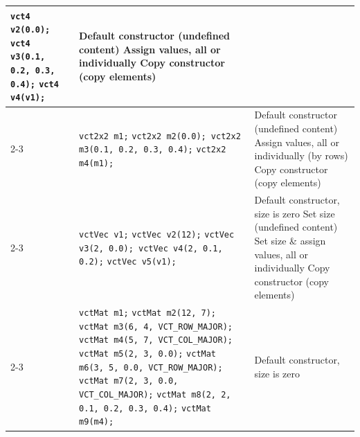 \documentclass[letterpaper,10pt]{article}
\begin{document}
\begin{center}
\begin{tabular}{|p{0.7in}|p{3.5in}|p{2.6in}|}
        \texttt{vct4 v2(0.0); vct4 v3(0.1, 0.2, 0.3, 0.4);} \newline
        \texttt{vct4 v4(v1);}
        &
        Default constructor (undefined content) \newline
        Assign values, all or individually \newline
        Copy constructor (copy elements)
        \\
        \cline{2-3}
        &
        \texttt{vct2x2 m1;} \newline
        \texttt{vct2x2 m2(0.0); vct2x2 m3(0.1, 0.2, 0.3, 0.4);} \newline
        \texttt{vct2x2 m4(m1);}
        &
        Default constructor (undefined content) \newline
        Assign values, all or individually (by rows) \newline
        Copy constructor (copy elements)
        \\
        \cline{2-3}
        &
        \texttt{vctVec v1;} \newline
        \texttt{vctVec v2(12);} \newline
        \texttt{vctVec v3(2, 0.0); vctVec v4(2, 0.1, 0.2);} \newline
        \texttt{vctVec v5(v1);}
        &
        Default constructor, size is zero \newline
        Set size (undefined content) \newline
        Set size \& assign values, all or individually \newline
        Copy constructor (copy elements)
        \\
        \cline{2-3}
        &
        \texttt{vctMat m1;} \newline
        \texttt{vctMat m2(12, 7);} \newline
        \texttt{vctMat m3(6, 4, VCT\_ROW\_MAJOR);} \newline
        \texttt{vctMat m4(5, 7, VCT\_COL\_MAJOR);} \newline
        \texttt{vctMat m5(2, 3, 0.0);} \newline
        \texttt{vctMat m6(3, 5, 0.0, VCT\_ROW\_MAJOR);} \newline
        \texttt{vctMat m7(2, 3, 0.0, VCT\_COL\_MAJOR);} \newline
        \texttt{vctMat m8(2, 2, 0.1, 0.2, 0.3, 0.4);} \newline
        \texttt{vctMat m9(m4);}
        &
        Default constructor, size is zero \newline

\end{tabular}
\end{center}
\end{document}
